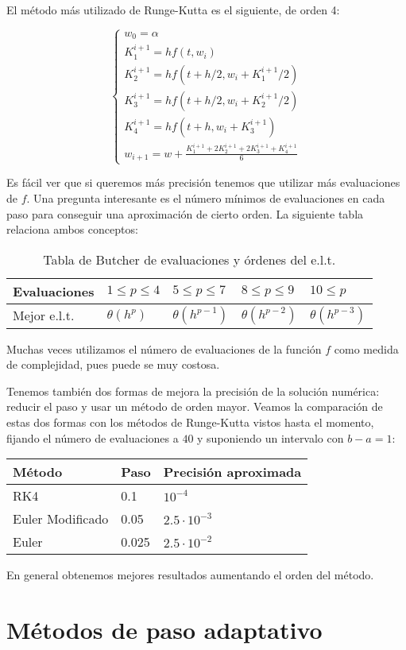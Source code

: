 El método más utilizado de Runge-Kutta es el siguiente, de orden 4:

\begin{definition}
\begin{equation}
\begin{cases}
    w_0=\alpha \\
    K_1^{i+1} = hf(t,w_i)\\
    K_2^{i+1} = hf(t + h/2,w_i+ K_1^{i+1}/2)\\
    K_3^{i+1} = hf(t + h/2,w_i+ K_2^{i+1}/2)\\
    K_4^{i+1} = hf(t + h,w_i + K_3^{i+1})\\

    w_{i+1}=w + \frac{K_1^{i+1} + 2K_2^{i+1} + 2K_3^{i+1} + K_4^{i+1}}{6}
\end{cases}
\end{equation}

\end{definition}


Es fácil ver que si queremos más precisión tenemos que utilizar más evaluaciones de $f$. Una pregunta interesante es el número mínimos de evaluaciones en cada paso para conseguir una aproximación de cierto orden. La siguiente tabla relaciona ambos conceptos:

\begin{table}[H]
\centering
\begin{tabular}{|l||l|l|l|l|}
    \hline
Evaluaciones & $1\leq p \leq 4$ & $5\leq p\leq 7$ & $8\leq p\leq 9$  & $10\leq p$ \\
    \hline
Mejor e.l.t. & $\theta(h^p)$ & $\theta(h^{p-1})$ & $\theta(h^{p-2})$ & $\theta(h^{p-3})$ \\
    \hline
\end{tabular}
\caption{Tabla de Butcher de evaluaciones y órdenes del e.l.t.}
\end{table}

Muchas veces utilizamos el número de evaluaciones de la función $f$ como medida de complejidad, pues puede se muy costosa.

Tenemos también dos formas de mejora la precisión de la solución numérica: reducir el paso y usar un método de orden mayor. Veamos la comparación de estas dos formas con los métodos de Runge-Kutta vistos hasta el momento, fijando el número de evaluaciones a $40$ y suponiendo un intervalo con $b-a=1$:

\begin{table}[H]
\centering
\begin{tabular}{|l|l|l|}
    \hline
Método           & Paso  & Precisión aproximada \\
    \hline
    \hline
RK4              & 0.1   & $10^{-4}$ \\
    \hline
Euler Modificado & 0.05  & $2.5\cdot 10^{-3}$ \\
    \hline
Euler            & 0.025 & $2.5\cdot 10^{-2}$ \\
    \hline
\end{tabular}
\end{table}

En general obtenemos mejores resultados aumentando el orden del método.


\section{Métodos de paso adaptativo}
